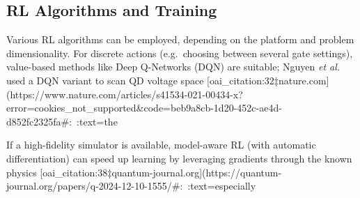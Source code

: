 \documentclass[12pt]{article}
\begin{document}
\subsection{RL Algorithms and Training}
Various RL algorithms can be employed, depending on the platform and problem dimensionality.  For discrete actions (e.g.\ choosing between several gate settings), value-based methods like Deep Q-Networks (DQN) are suitable; Nguyen \textit{et al.} used a DQN variant to scan QD voltage space [oai_citation:32‡nature.com](https://www.nature.com/articles/s41534-021-00434-x?error=cookies_not_supported&code=beb9a8cb-1d20-452c-ae4d-d852fc2325fa#:~:text=the%

If a high-fidelity simulator is available, model-aware RL (with automatic differentiation) can speed up learning by leveraging gradients through the known physics [oai_citation:38‡quantum-journal.org](https://quantum-journal.org/papers/q-2024-12-10-1555/#:~:text=especially%
\end{document}
